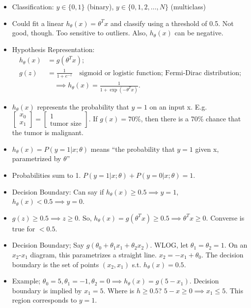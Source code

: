 \documentclass[10pt]{article}
\begin{document}
\begin{itemize}
  \item Classification: $y \in \{ 0,1 \}$ (binary), $y \in \{ 0,1,2, \dots, N \}$ (multiclass)
  \item Could fit a linear $h_{\theta}(x) = \theta^Tx$ and classify
    using a threshold of 0.5. Not good, though. Too sensitive to
    outliers. Also, $h_{\theta}(x)$ can be negative.
  \item Hypothesis Representation:
    \begin{align*}
      h_{\theta}(x) &= g(\theta^Tx); \\
      g(z) &= \frac{1}{1+e^{-z}} \quad \text{sigmoid or logistic function; Fermi-Dirac distribution;}\\
      &\quad \implies h_{\theta}(x) = \frac{1}{1 + \exp\left( -\theta^T x\right)}.
    \end{align*}
  \item $h_{\theta}(x)$ represents the probability that $y=1$ on an
    input x. E.g. $\begin{bmatrix}x_0 \\ x_1 \end{bmatrix}
    = \begin{bmatrix}1 \\ \text{tumor size} \end{bmatrix}$. If
    $g(x)=70\%$, then there is a 70\% chance that the tumor is
    malignant.
  \item $h_{\theta}(x) = P \left( \left. y=1 \right| x; \theta \right)$ means ``the probability that $y=1$ given x, parametrized by $\theta$''
  \item Probabilities sum to 1. $P \left( \left. y=1 \right| x; \theta \right) + P \left( \left. y=0 \right| x; \theta \right) = 1$.
  \item Decision Boundary: Can say if $h_{\theta}(x) \geq 0.5 \implies y=1$, $h_{\theta}(x) < 0.5 \implies y=0$.
  \item $g(z) \geq 0.5 \implies z \geq 0$. So, $h_{\theta}(x)=g(\theta^Tx) \geq 0.5 \implies \theta^Tx \geq 0.$ Converse is true for $<0.5$.
  \item Decision Boundary; Say $g(\theta_0 + \theta_1x_1 +
    \theta_2x_2)$. WLOG, let $\theta_1=\theta_2=1$. On an $x_2$-$x_1$
    diagram, this parametrizes a straight line. $x_2 = -x_1 +
    \theta_0$. The decision boundary is the set of points $(x_2,x_1)$
    s.t. $h_{\theta}(x)=0.5$.
  \item Example; $\theta_0=5, \theta_1=-1, \theta_2=0 \implies h_{\theta}(x) = g(5-x_1)$. Decision boundary is implied by $x_1=5$. Where is $h \geq 0.5$? $5-x \geq 0 \implies x_1 \leq 5$. This region corresponds to $y=1$.

\end{itemize}
\end{document}
